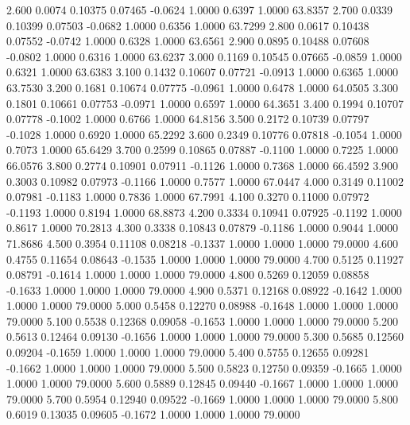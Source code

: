    2.600   0.0074   0.10375   0.07465  -0.0624   1.0000   0.6397   1.0000  63.8357
   2.700   0.0339   0.10399   0.07503  -0.0682   1.0000   0.6356   1.0000  63.7299
   2.800   0.0617   0.10438   0.07552  -0.0742   1.0000   0.6328   1.0000  63.6561
   2.900   0.0895   0.10488   0.07608  -0.0802   1.0000   0.6316   1.0000  63.6237
   3.000   0.1169   0.10545   0.07665  -0.0859   1.0000   0.6321   1.0000  63.6383
   3.100   0.1432   0.10607   0.07721  -0.0913   1.0000   0.6365   1.0000  63.7530
   3.200   0.1681   0.10674   0.07775  -0.0961   1.0000   0.6478   1.0000  64.0505
   3.300   0.1801   0.10661   0.07753  -0.0971   1.0000   0.6597   1.0000  64.3651
   3.400   0.1994   0.10707   0.07778  -0.1002   1.0000   0.6766   1.0000  64.8156
   3.500   0.2172   0.10739   0.07797  -0.1028   1.0000   0.6920   1.0000  65.2292
   3.600   0.2349   0.10776   0.07818  -0.1054   1.0000   0.7073   1.0000  65.6429
   3.700   0.2599   0.10865   0.07887  -0.1100   1.0000   0.7225   1.0000  66.0576
   3.800   0.2774   0.10901   0.07911  -0.1126   1.0000   0.7368   1.0000  66.4592
   3.900   0.3003   0.10982   0.07973  -0.1166   1.0000   0.7577   1.0000  67.0447
   4.000   0.3149   0.11002   0.07981  -0.1183   1.0000   0.7836   1.0000  67.7991
   4.100   0.3270   0.11000   0.07972  -0.1193   1.0000   0.8194   1.0000  68.8873
   4.200   0.3334   0.10941   0.07925  -0.1192   1.0000   0.8617   1.0000  70.2813
   4.300   0.3338   0.10843   0.07879  -0.1186   1.0000   0.9044   1.0000  71.8686
   4.500   0.3954   0.11108   0.08218  -0.1337   1.0000   1.0000   1.0000  79.0000
   4.600   0.4755   0.11654   0.08643  -0.1535   1.0000   1.0000   1.0000  79.0000
   4.700   0.5125   0.11927   0.08791  -0.1614   1.0000   1.0000   1.0000  79.0000
   4.800   0.5269   0.12059   0.08858  -0.1633   1.0000   1.0000   1.0000  79.0000
   4.900   0.5371   0.12168   0.08922  -0.1642   1.0000   1.0000   1.0000  79.0000
   5.000   0.5458   0.12270   0.08988  -0.1648   1.0000   1.0000   1.0000  79.0000
   5.100   0.5538   0.12368   0.09058  -0.1653   1.0000   1.0000   1.0000  79.0000
   5.200   0.5613   0.12464   0.09130  -0.1656   1.0000   1.0000   1.0000  79.0000
   5.300   0.5685   0.12560   0.09204  -0.1659   1.0000   1.0000   1.0000  79.0000
   5.400   0.5755   0.12655   0.09281  -0.1662   1.0000   1.0000   1.0000  79.0000
   5.500   0.5823   0.12750   0.09359  -0.1665   1.0000   1.0000   1.0000  79.0000
   5.600   0.5889   0.12845   0.09440  -0.1667   1.0000   1.0000   1.0000  79.0000
   5.700   0.5954   0.12940   0.09522  -0.1669   1.0000   1.0000   1.0000  79.0000
   5.800   0.6019   0.13035   0.09605  -0.1672   1.0000   1.0000   1.0000  79.0000
